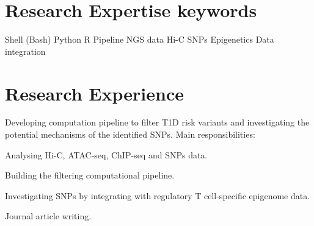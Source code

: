 \documentclass[]{deedy-resume-openfont}
\begin{document}
%
%
\lastupdated

%
%






\section{Research Expertise keywords}
\begin{flushleft}
Shell (Bash) \textbullet{} Python \textbullet{} R \textbullet{} Pipeline \textbullet{} NGS data \textbullet{} Hi-C \textbullet{} SNPs \textbullet{} Epigenetics \textbullet{} Data integration \\ 
\end{flushleft}

\section{Research Experience}

Developing computation pipeline to filter T1D risk variants and investigating the potential mechanisms of the identified SNPs.
Main responsibilities:
\begin{tightemize}
\item Analysing Hi-C, ATAC-seq, ChIP-seq and SNPs data.
\item Building the filtering computational pipeline.
\item Investigating SNPs by integrating with regulatory T cell-specific epigenome data.
\item Journal article writing.
\end{tightemize}
\sectionsep
\end{document}
